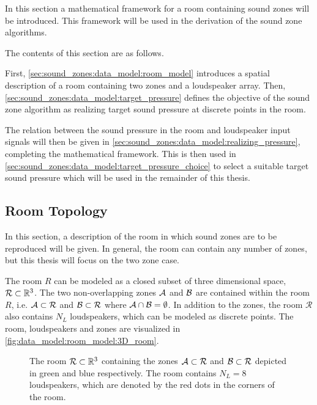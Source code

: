 In this section a mathematical framework for a room containing sound zones will be introduced.
This framework will be used in the derivation of the sound zone algorithms.

The contents of this section are as follows.

First, \autoref{sec:sound_zones:data_model:room_model} introduces a spatial description of a room containing two zones and a loudspeaker array.
Then, \autoref{sec:sound_zones:data_model:target_pressure} defines the objective of the sound zone algorithm as realizing target sound pressure at discrete points in the room.

The relation between the sound pressure in the room and loudspeaker input signals will then be given in \autoref{sec:sound_zones:data_model:realizing_pressure}, completing the mathematical framework.
This is then used in \autoref{sec:sound_zones:data_model:target_pressure_choice} to select a suitable target sound pressure which will be used in the remainder of this thesis.

\subsection{Room Topology}
\label{ch:sound_zone:data_model:room_topology}
In this section, a description of the room in which sound zones are to be reproduced will be given.
In general, the room can contain any number of zones, but this thesis will focus on the two zone case. 

The room $R$ can be modeled as a closed subset of three dimensional space, $\mathcal{R} \subset \mathbb{R}^{3}$.
The two non-overlapping zones $\mathcal{A}$ and $\mathcal{B}$ are contained within the room $R$, 
i.e. $\mathcal{A} \subset \mathcal{R}$ and $\mathcal{B} \subset \mathcal{R}$ where $\mathcal{A} \cap \mathcal{B} = \emptyset$.
In addition to the zones, the room $\mathcal{R}$ also contains $N_L$ loudspeakers, which can be modeled as discrete points.
The room, loudspeakers and zones are visualized in \autoref{fig:data_model:room_model:3D_room}.

\begin{figure}
    \centering
    
    \caption{The room $\mathcal{R}\subset \mathbb{R}^{3}$ containing the zones $\mathcal{A}\subset\mathcal{R}$ 
    and $\mathcal{B}\subset\mathcal{R}$ depicted in green and blue respectively. 
    The room contains $N_L = 8$ loudspeakers, which are denoted by the red dots in the corners of the room.}
    \label{fig:data_model:room_model:3D_room}
\end{figure}

